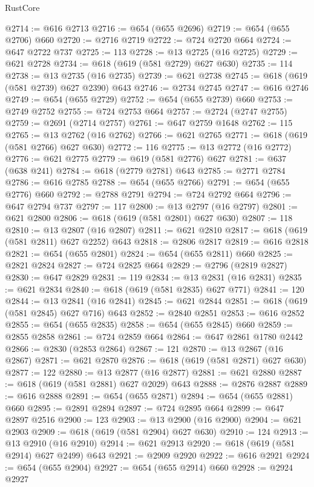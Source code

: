 \begin{lexlean}{RustCore}
\begin{coremodule}
@2714 := @616 @2713
@2716 := @654 (@655 @2696)
@2719 := @654 (@655 @2706) @660
@2720 := @2716 @2719
@2722 := @724 @2720 @664
@2724 := @647 @2722 @737
@2725 := 113
@2728 := @13 @2725 (@16 @2725)
@2729 := @621 @2728
@2734 := @618 (@619 (@581 @2729) @627 @630)
@2735 := 114
@2738 := @13 @2735 (@16 @2735)
@2739 := @621 @2738
@2745 := @618 (@619 (@581 @2739) @627 @2390) @643
@2746 := @2734 @2745
@2747 := @616 @2746
@2749 := @654 (@655 @2729)
@2752 := @654 (@655 @2739) @660
@2753 := @2749 @2752
@2755 := @724 @2753 @664
@2757 := @2724 (@2747 @2755)
@2759 := @2691 (@2714 @2757)
@2761 := @647 @2759 @1648
@2762 := 115
@2765 := @13 @2762 (@16 @2762)
@2766 := @621 @2765
@2771 := @618 (@619 (@581 @2766) @627 @630)
@2772 := 116
@2775 := @13 @2772 (@16 @2772)
@2776 := @621 @2775
@2779 := @619 (@581 @2776) @627
@2781 := @637 (@638 @241)
@2784 := @618 (@2779 @2781) @643
@2785 := @2771 @2784
@2786 := @616 @2785
@2788 := @654 (@655 @2766)
@2791 := @654 (@655 @2776) @660
@2792 := @2788 @2791
@2794 := @724 @2792 @664
@2796 := @647 @2794 @737
@2797 := 117
@2800 := @13 @2797 (@16 @2797)
@2801 := @621 @2800
@2806 := @618 (@619 (@581 @2801) @627 @630)
@2807 := 118
@2810 := @13 @2807 (@16 @2807)
@2811 := @621 @2810
@2817 := @618 (@619 (@581 @2811) @627 @2252) @643
@2818 := @2806 @2817
@2819 := @616 @2818
@2821 := @654 (@655 @2801)
@2824 := @654 (@655 @2811) @660
@2825 := @2821 @2824
@2827 := @724 @2825 @664
@2829 := @2796 (@2819 @2827)
@2830 := @647 @2829
@2831 := 119
@2834 := @13 @2831 (@16 @2831)
@2835 := @621 @2834
@2840 := @618 (@619 (@581 @2835) @627 @771)
@2841 := 120
@2844 := @13 @2841 (@16 @2841)
@2845 := @621 @2844
@2851 := @618 (@619 (@581 @2845) @627 @716) @643
@2852 := @2840 @2851
@2853 := @616 @2852
@2855 := @654 (@655 @2835)
@2858 := @654 (@655 @2845) @660
@2859 := @2855 @2858
@2861 := @724 @2859 @664
@2864 := @647 @2861 @1780 @2442
@2866 := @2830 (@2853 @2864)
@2867 := 121
@2870 := @13 @2867 (@16 @2867)
@2871 := @621 @2870
@2876 := @618 (@619 (@581 @2871) @627 @630)
@2877 := 122
@2880 := @13 @2877 (@16 @2877)
@2881 := @621 @2880
@2887 := @618 (@619 (@581 @2881) @627 @2029) @643
@2888 := @2876 @2887
@2889 := @616 @2888
@2891 := @654 (@655 @2871)
@2894 := @654 (@655 @2881) @660
@2895 := @2891 @2894
@2897 := @724 @2895 @664
@2899 := @647 @2897 @2516
@2900 := 123
@2903 := @13 @2900 (@16 @2900)
@2904 := @621 @2903
@2909 := @618 (@619 (@581 @2904) @627 @630)
@2910 := 124
@2913 := @13 @2910 (@16 @2910)
@2914 := @621 @2913
@2920 := @618 (@619 (@581 @2914) @627 @2499) @643
@2921 := @2909 @2920
@2922 := @616 @2921
@2924 := @654 (@655 @2904)
@2927 := @654 (@655 @2914) @660
@2928 := @2924 @2927

\end{coremodule}
\end{lexlean}

